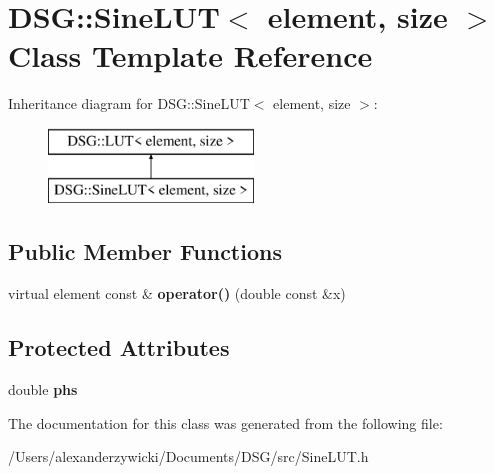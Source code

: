 \hypertarget{class_d_s_g_1_1_sine_l_u_t}{\section{D\+S\+G\+:\+:Sine\+L\+U\+T$<$ element, size $>$ Class Template Reference}
\label{class_d_s_g_1_1_sine_l_u_t}
}
Inheritance diagram for D\+S\+G\+:\+:Sine\+L\+U\+T$<$ element, size $>$\+:\begin{figure}[H]
\begin{center}
\leavevmode
\includegraphics[height=2.000000cm]{class_d_s_g_1_1_sine_l_u_t}
\end{center}
\end{figure}
\subsection*{Public Member Functions}
\begin{DoxyCompactItemize}
\item 
\hypertarget{class_d_s_g_1_1_sine_l_u_t_a1373f5663138855be2ea01999b6d6ac8}{virtual element const \& {\bfseries operator()} (double const \&x)}\label{class_d_s_g_1_1_sine_l_u_t_a1373f5663138855be2ea01999b6d6ac8}

\end{DoxyCompactItemize}
\subsection*{Protected Attributes}
\begin{DoxyCompactItemize}
\item 
\hypertarget{class_d_s_g_1_1_sine_l_u_t_ae780e53f58e2c7dc0568ee96f2d5598b}{double {\bfseries phs}}\label{class_d_s_g_1_1_sine_l_u_t_ae780e53f58e2c7dc0568ee96f2d5598b}

\end{DoxyCompactItemize}


The documentation for this class was generated from the following file\+:\begin{DoxyCompactItemize}
\item 
/\+Users/alexanderzywicki/\+Documents/\+D\+S\+G/src/Sine\+L\+U\+T.\+h\end{DoxyCompactItemize}
